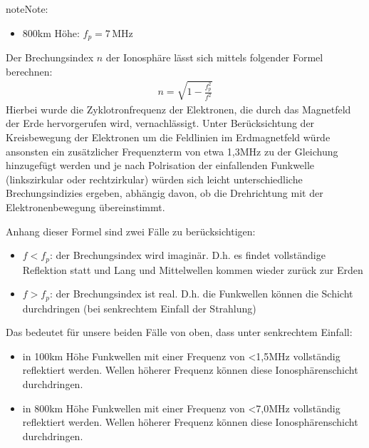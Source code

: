 \documentclass[letterpaper,10pt,english]{jupyterBook}
\begin{document}
\begin{sphinxadmonition}{note}{Note:}
\begin{itemize}
\item {} 
\sphinxAtStartPar
800km Höhe: \(f_p = 7\,\mathrm{MHz}\)

\end{itemize}

\sphinxAtStartPar
Der Brechungsindex \(n\) der Ionosphäre lässt sich mittels folgender Formel berechnen:
\begin{equation*}
\begin{split}n = \sqrt{1- \frac{f_p^2}{f^2}}\end{split}
\end{equation*}
\sphinxAtStartPar
Hierbei wurde die Zyklotronfrequenz der Elektronen, die durch das Magnetfeld der Erde  hervorgerufen wird, vernachlässigt. Unter Berücksichtung der Kreisbewegung der Elektronen um die Feldlinien im Erdmagnetfeld würde ansonsten ein zusätzlicher Frequenzterm von etwa 1,3MHz zu der Gleichung hinzugefügt werden und je nach Polrisation der einfallenden Funkwelle (links\sphinxhyphen{}zirkular oder recht\sphinxhyphen{}zirkular) würden sich leicht unterschiedliche Brechungsindizies ergeben, abhängig davon, ob die Drehrichtung mit der Elektronenbewegung übereinstimmt.

\sphinxAtStartPar
Anhang dieser Formel sind zwei Fälle zu berücksichtigen:
\begin{itemize}
\item {} 
\sphinxAtStartPar
\(f < f_p\): der Brechungsindex wird imaginär. D.h. es findet vollständige Reflektion statt und Lang\sphinxhyphen{} und Mittelwellen kommen wieder zurück zur Erden

\item {} 
\sphinxAtStartPar
\(f > f_p\): der Brechungsindex ist real. D.h. die Funkwellen können die Schicht durchdringen (bei senkrechtem Einfall der Strahlung)

\end{itemize}

\sphinxAtStartPar
Das bedeutet für unsere beiden Fälle von oben, dass unter senkrechtem Einfall:
\begin{itemize}
\item {} 
\sphinxAtStartPar
in 100km Höhe Funkwellen mit einer Frequenz von <1,5MHz vollständig reflektiert werden. Wellen höherer Frequenz können diese Ionosphärenschicht durchdringen.

\item {} 
\sphinxAtStartPar
in 800km Höhe Funkwellen mit einer Frequenz von <7,0MHz vollständig reflektiert werden. Wellen höherer Frequenz können diese Ionosphärenschicht durchdringen.


\end{itemize}
\end{sphinxadmonition}
\end{document}
